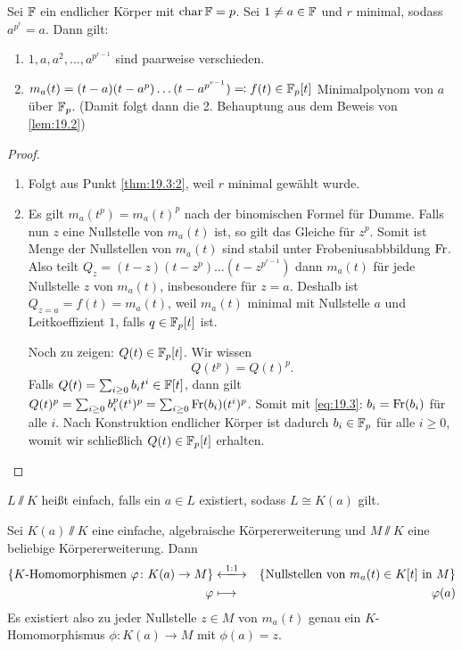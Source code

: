 \documentclass[12pt,a4paper]{scrartcl}
\begin{document}
\begin{satz} \label{thm:19.3}
	Sei $\mathbb F$ ein endlicher Körper mit $\operatorname{char} \mathbb F = p$. Sei $1\neq a\in\mathbb F$ und $r$ minimal, sodass $a^{p^r} =a$. Dann gilt:
	\begin{enumerate}
		\item $1, a, a^2,\dots, a^{p^{r-1}}$ sind paarweise verschieden.
		\item $m_a(t) = (t-a)(t-a^p)\dots(t-a^{p^{r-1}}) \eqqcolon f(t)\in\mathbb F_p[t]$ Minimalpolynom von $a$ über $\mathbb F_p$. \textup(Damit folgt dann die 2. Behauptung aus dem Beweis von \cref{lem:19.2}\textup) \label{thm:19.3:2}
	\end{enumerate}
\end{satz}
\begin{proof}
	\leavevmode
	\begin{enumerate}
		\item Folgt aus Punkt \ref{thm:19.3:2}, weil $r$ minimal gewählt wurde.
		\item Es gilt $m_a(t^p) = m_a(t)^p$ nach der binomischen Formel \glqq für Dumme\grqq. Falls nun $z$ eine Nullstelle von $m_a(t)$ ist, so gilt das Gleiche für $z^p$. Somit ist Menge der Nullstellen von $m_a(t)$ sind stabil unter Frobeniusabbbildung $\operatorname{Fr}$. Also teilt $Q_z = (t-z)(t-z^p)\dots(t-z^{p^{r-1}})$ dann $m_a(t)$ für jede Nullstelle $z$ von $m_a(t)$, insbesondere für $z = a$. Deshalb ist $Q_{z = a} = f(t) = m_a(t)$, weil $m_a(t)$ minimal mit Nullstelle $a$ und Leitkoeffizient $1$, falls $q\in\mathbb F_p[t]$ ist.
	
		Noch zu zeigen: $Q(t) \in\mathbb F_p[t]$. Wir wissen
		\begin{equation}Q(t^p) = Q(t)^p. \tag{*}\label{eq:19.3}\end{equation}
		Falls $Q(t) = \sum_{i \geq 0}b_it^i\in\mathbb F[t]$, dann gilt $Q(t)^p = \sum_{i \geq 0} b_i^p(t^i)^p = \sum_{i\geq 0} \operatorname{Fr}(b_i)(t^i)^p$. Somit mit \eqref{eq:19.3}: $b_i = \operatorname{Fr}(b_i)$ für alle $i$. Nach Konstruktion endlicher Körper ist dadurch $b_i\in \mathbb F_p$ für alle $i\ge 0$, womit wir schließlich $Q(t) \in\mathbb F_p[t]$ erhalten.
  \qedhere
	\end{enumerate}
\end{proof}
\begin{defi} $L\sslash K$ heißt einfach, falls ein $a\in L$ existiert, sodass $L\cong K(a)$ gilt.
\end{defi}
\begin{satz}
	Sei $K(a)\sslash K$ eine einfache, algebraische Körpererweiterung und $M\sslash K$ eine beliebige Körpererweiterung. Dann
	\begin{eqnarray*}
		\{K\text{-Homomorphismen } \phi\colon K(a)\to M\} & \xlongleftrightarrow{1:1} & \{\text{Nullstellen von }m_a(t)\in K[t]\text{ in }M\}\\
		\phi &\longmapsto & \phi(a)
	\end{eqnarray*}
	Es existiert also zu jeder Nullstelle $z\in M$ von $m_a(t)$ genau ein $K$-Homomorphismus $\phi\colon K(a)\to M$ mit $\phi(a) = z$.
\end{satz}
\end{document}
